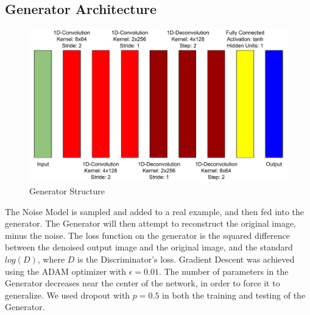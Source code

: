 \documentclass[12pt]{article}
\begin{document}
{\subsection{Generator Architecture}
\begin{center}
\begin{figure}
\includegraphics[scale=0.5]{TopoGenerator}
\caption{Generator Structure}
\end{figure}
\end{center}
The Noise Model is sampled and added to a real example, and then fed into the
generator. The Generator will then attempt to reconstruct the original image,
minus the noise. The loss function on the generator is the squared difference
between the denoised output image and the original image, and the standard
$log(D)$, where $D$ is the Discriminator's loss.
Gradient Descent was achieved using the ADAM optimizer with $\epsilon=0.01$. The
number of parameters in the Generator decreases near the center of the network,
in order to force it to generalize. We used dropout with $p=0.5$ in both the
training and testing of the Generator.

}
\end{document}
